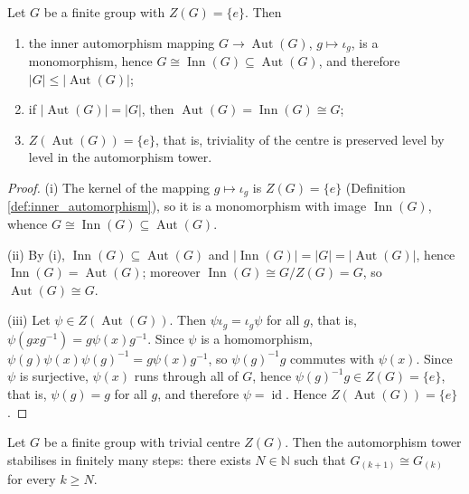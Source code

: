 \begin{lemma}\label{ch8_centreless_embedding}
Let $G$ be a finite group with $Z(G)=\{e\}$. Then
\begin{enumerate}[label=(\roman*)]
    \item the inner automorphism mapping $G\to\operatorname{Aut}(G)$, $g\mapsto\iota_g$, is a monomorphism, hence $G\cong\operatorname{Inn}(G)\subseteq\operatorname{Aut}(G)$, and therefore $|G|\le|\operatorname{Aut}(G)|$;
    \item if $|\operatorname{Aut}(G)|=|G|$, then $\operatorname{Aut}(G)=\operatorname{Inn}(G)\cong G$;
    \item $Z(\operatorname{Aut}(G))=\{e\}$, that is, triviality of the centre is preserved level by level in the automorphism tower.
\end{enumerate}
\end{lemma}

\begin{proof}
(i) The kernel of the mapping $g\mapsto\iota_g$ is $Z(G)=\{e\}$ (Definition \ref{def:inner_automorphism}), so it is a monomorphism with image $\operatorname{Inn}(G)$, whence $G\cong\operatorname{Inn}(G)\subseteq\operatorname{Aut}(G)$.

(ii) By (i), $\operatorname{Inn}(G)\subseteq\operatorname{Aut}(G)$ and $|\operatorname{Inn}(G)|=|G|=|\operatorname{Aut}(G)|$, hence $\operatorname{Inn}(G)=\operatorname{Aut}(G)$; moreover $\operatorname{Inn}(G)\cong G/Z(G)=G$, so $\operatorname{Aut}(G)\cong G$.

(iii) Let $\psi\in Z(\operatorname{Aut}(G))$. Then $\psi\iota_g=\iota_g\psi$ for all $g$, that is, $\psi(gxg^{-1})=g\psi(x)g^{-1}$. Since $\psi$ is a homomorphism, $\psi(g)\psi(x)\psi(g)^{-1}=g\psi(x)g^{-1}$, so $\psi(g)^{-1}g$ commutes with $\psi(x)$. Since $\psi$ is surjective, $\psi(x)$ runs through all of $G$, hence $\psi(g)^{-1}g\in Z(G)=\{e\}$, that is, $\psi(g)=g$ for all $g$, and therefore $\psi=\operatorname{id}$. Hence $Z(\operatorname{Aut}(G))=\{e\}$.
\end{proof}

\begin{theorem}\label{thm:finite_automorphism_tower}
Let $G$ be a finite group with trivial centre $Z(G)$. Then the automorphism tower stabilises in finitely many steps: there exists $N \in \mathbb{N}$ such that $G_{(k+1)} \cong G_{(k)}$ for every $k \ge N$.
\end{theorem}

